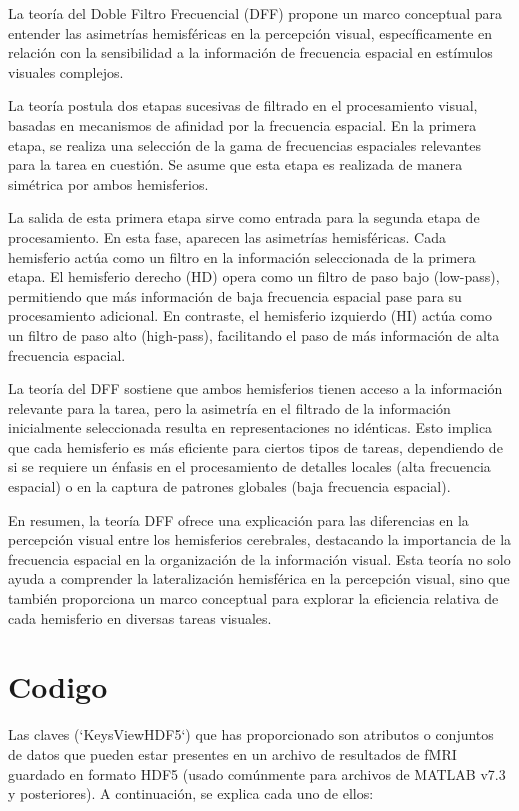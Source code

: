 \documentclass{article}
\begin{document}
	La teoría del Doble Filtro Frecuencial (DFF) propone un marco conceptual para entender las asimetrías hemisféricas en la percepción visual, específicamente en relación con la sensibilidad a la información de frecuencia espacial en estímulos visuales complejos.
	
	La teoría postula dos etapas sucesivas de filtrado en el procesamiento visual, basadas en mecanismos de afinidad por la frecuencia espacial. En la primera etapa, se realiza una selección de la gama de frecuencias espaciales relevantes para la tarea en cuestión. Se asume que esta etapa es realizada de manera simétrica por ambos hemisferios.
	
	La salida de esta primera etapa sirve como entrada para la segunda etapa de procesamiento. En esta fase, aparecen las asimetrías hemisféricas. Cada hemisferio actúa como un filtro en la información seleccionada de la primera etapa. El hemisferio derecho (HD) opera como un filtro de paso bajo (low-pass), permitiendo que más información de baja frecuencia espacial pase para su procesamiento adicional. En contraste, el hemisferio izquierdo (HI) actúa como un filtro de paso alto (high-pass), facilitando el paso de más información de alta frecuencia espacial.
	
	La teoría del DFF sostiene que ambos hemisferios tienen acceso a la información relevante para la tarea, pero la asimetría en el filtrado de la información inicialmente seleccionada resulta en representaciones no idénticas. Esto implica que cada hemisferio es más eficiente para ciertos tipos de tareas, dependiendo de si se requiere un énfasis en el procesamiento de detalles locales (alta frecuencia espacial) o en la captura de patrones globales (baja frecuencia espacial).
	
	En resumen, la teoría DFF ofrece una explicación para las diferencias en la percepción visual entre los hemisferios cerebrales, destacando la importancia de la frecuencia espacial en la organización de la información visual. Esta teoría no solo ayuda a comprender la lateralización hemisférica en la percepción visual, sino que también proporciona un marco conceptual para explorar la eficiencia relativa de cada hemisferio en diversas tareas visuales.
	
	\section{Codigo}
	
	Las claves (`KeysViewHDF5`) que has proporcionado son atributos o conjuntos de datos que pueden estar presentes en un archivo de resultados de fMRI guardado en formato HDF5 (usado comúnmente para archivos de MATLAB v7.3 y posteriores). A continuación, se explica cada uno de ellos:
	
\end{document}

